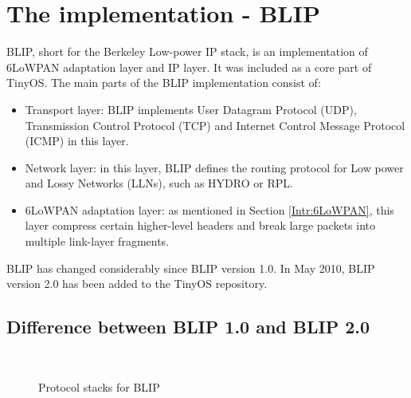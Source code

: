 \section{The implementation - BLIP}
\label{Blip}
BLIP, short for the Berkeley Low-power IP stack, is an implementation of 6LoWPAN adaptation layer and IP layer. It was included as a core part of TinyOS. The main parts of the BLIP implementation consist of:
\begin{itemize}
\item Transport layer: BLIP implements User Datagram Protocol (UDP), Transmission Control Protocol (TCP) and Internet Control Message Protocol (ICMP) in this layer.

\item Network layer: in this layer, BLIP defines the routing protocol for Low power and Lossy Networks (LLNs), such as HYDRO or RPL.
 
\item 6LoWPAN adaptation layer: as mentioned in Section \ref{Intr:6LoWPAN}, this layer compress certain higher-level headers and break large packets into multiple link-layer fragments.
\end{itemize}

BLIP has changed considerably since BLIP version 1.0. In May 2010, BLIP version 2.0 has been added to the TinyOS repository. 
\subsection{Difference between BLIP 1.0 and BLIP 2.0}
\label{Blip:1.0-2.0}

\begin{figure}[htbp]
  \begin{center}
    \leavevmode
    \\
    \caption{Protocol stacks for BLIP}
    \label{fig:blip}
  \end{center}
\end{figure}

